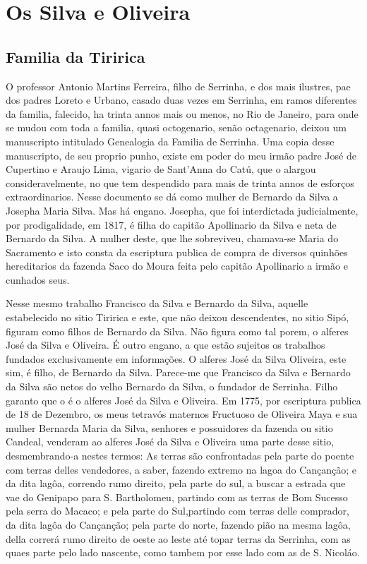 \chapter{Os Silva e Oliveira}
\begin{centering}
	\section*{Familia da Tiririca}
\end{centering}


O professor Antonio Martins Ferreira, filho de Serrinha, e dos mais ilustres, pae dos padres Loreto e Urbano, casado duas vezes em Serrinha, em ramos diferentes da familia, falecido, ha trinta annos mais ou menos, no Rio de Janeiro, para onde se mudou com toda a familia, quasi octogenario, senão octagenario, deixou um manuscripto intitulado Genealogia da Familia de Serrinha. Uma copia desse manuscripto, de seu proprio punho, existe em poder do meu irmão padre José de Cupertino e Araujo Lima, vigario de Sant'Anna do Catú, que o alargou consideravelmente, no que tem despendido para mais de trinta annos de esforços extraordinarios. Nesse documento se dá como mulher de Bernardo da Silva a Josepha Maria Silva. Mas há engano. Josepha, que foi interdictada judicialmente, por prodigalidade, em 1817, é filha do capitão Apollinario da Silva e neta de Bernardo da Silva. A mulher deste, que lhe sobreviveu, chamava-se Maria do Sacramento e isto consta da escriptura publica de compra de diversos quinhões hereditarios da fazenda Saco do Moura feita pelo capitão Apollinario a irmão e cunhados seus.

Nesse mesmo trabalho Francisco da Silva e Bernardo da Silva, aquelle estabelecido no sitio Tiririca e este, que não deixou descendentes, no sitio Sipó, figuram como filhos de Bernardo da Silva. Não figura como tal porem, o alferes José da Silva e Oliveira. É outro engano, a que estão sujeitos os trabalhos fundados exclusivamente em informações. O alferes José da Silva Oliveira, este sim, é filho, de Bernardo da Silva. Parece-me que Francisco da Silva e Bernardo da Silva são netos do velho Bernardo da Silva, o fundador de Serrinha. Filho garanto que o é o alferes José da Silva e Oliveira. Em 1775, por escriptura publica de 18  de Dezembro, os meus tetravós maternos Fructuoso de Oliveira Maya e sua mulher Bernarda Maria da Silva, senhores e
possuidores da fazenda ou sitio Candeal, venderam ao alferes José da Silva e Oliveira uma parte desse sitio, desmembrando-a nestes termos: As  terras são confrontadas pela parte do poente com terras delles vendedores, a saber, fazendo extremo na lagoa do Cançanção; e da dita lagôa, correndo rumo direito, pela parte do sul, a buscar a estrada que vae do Genipapo para  S. Bartholomeu, partindo com  as terras de Bom Sucesso pela serra do Macaco; e pela parte do Sul,partindo com terras delle comprador, da dita lagôa do Cançanção; pela parte do norte, fazendo pião na mesma lagôa, della correrá rumo direito de oeste ao leste até topar terras da Serrinha, com as quaes parte pelo lado nascente, como tambem por esse lado com as de S. Nicoláo.

